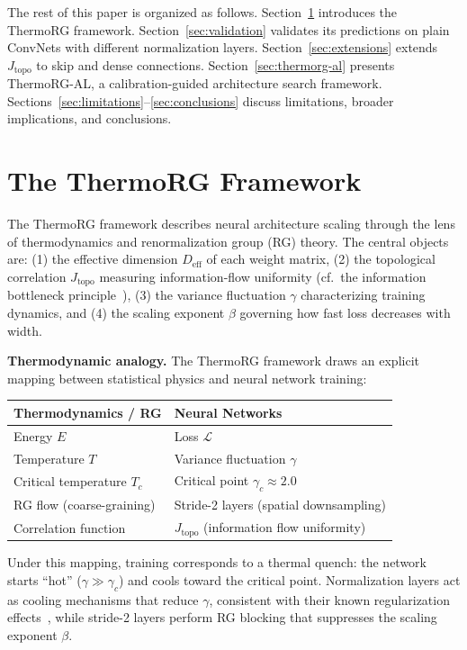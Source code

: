 \documentclass[11pt, a4paper]{article}
\theoremstyle{plain}
\begin{document}
The rest of this paper is organized as follows. Section~\ref{sec:framework} introduces the ThermoRG framework. Section~\ref{sec:validation} validates its predictions on plain ConvNets with different normalization layers. Section~\ref{sec:extensions} extends $J_{\mathrm{topo}}$ to skip and dense connections. Section~\ref{sec:thermorg-al} presents ThermoRG-AL, a calibration-guided architecture search framework. Sections~\ref{sec:limitations}--\ref{sec:conclusions} discuss limitations, broader implications, and conclusions.

\section{The ThermoRG Framework}\label{sec:framework}

The ThermoRG framework describes neural architecture scaling through the lens of thermodynamics and renormalization group (RG) theory. The central objects are: (1) the effective dimension $D_{\mathrm{eff}}$ of each weight matrix, (2) the topological correlation $J_{\mathrm{topo}}$ measuring information-flow uniformity (cf.\ the information bottleneck principle~\citep{tishby2015deep}), (3) the variance fluctuation $\gamma$ characterizing training dynamics, and (4) the scaling exponent $\beta$ governing how fast loss decreases with width.

\medskip
\noindent\textbf{Thermodynamic analogy.} The ThermoRG framework draws an explicit mapping between statistical physics and neural network training:
\begin{center}
\begin{tabular}{ll}
\toprule
Thermodynamics / RG & Neural Networks \\
\midrule
Energy $E$ & Loss $\mathcal{L}$ \\
Temperature $T$ & Variance fluctuation $\gamma$ \\
Critical temperature $T_c$ & Critical point $\gamma_c \approx 2.0$ \\
RG flow (coarse-graining) & Stride-2 layers (spatial downsampling) \\
Correlation function & $J_{\mathrm{topo}}$ (information flow uniformity) \\
\bottomrule
\end{tabular}
\end{center}
\medskip
Under this mapping, training corresponds to a thermal quench: the network starts ``hot'' ($\gamma \gg \gamma_c$) and cools toward the critical point. Normalization layers act as cooling mechanisms that reduce $\gamma$, consistent with their known regularization effects~\citep{vanLaarhoven2017l2}, while stride-2 layers perform RG blocking that suppresses the scaling exponent $\beta$.
\end{document}
